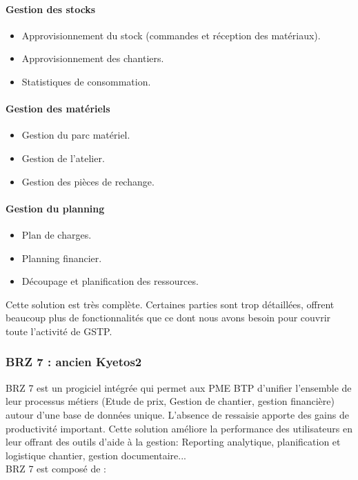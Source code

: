 				\paragraph{Gestion des stocks}
				\begin{itemize}
				    \item Approvisionnement du stock (commandes et réception des matériaux).
				    \item Approvisionnement des chantiers.
				    \item Statistiques de consommation.
				\end{itemize}
				
				\paragraph{Gestion des matériels}
				\begin{itemize}
				    \item Gestion du parc matériel.
				    \item Gestion de l'atelier.
				    \item Gestion des pièces de rechange.
				\end{itemize}
				
				\paragraph{Gestion du planning}
				\begin{itemize}
				    \item Plan de charges.
				    \item Planning financier.
				    \item Découpage et planification des ressources.
				\end{itemize}
				
		Cette solution est très complète. Certaines parties sont trop détaillées, offrent beaucoup plus de fonctionnalités que ce dont nous avons besoin pour couvrir toute l'activité de GSTP.
			
		\subsubsection{BRZ 7 : ancien Kyetos2}
		
		BRZ 7 est un progiciel intégrée qui permet aux PME BTP d'unifier l'ensemble de leur processus métiers (Etude de prix, Gestion de chantier, gestion financière) autour d'une base de données unique. 
    L'absence de ressaisie apporte des gains de productivité important. 
    Cette solution améliore la performance des utilisateurs en leur offrant des outils d'aide à la gestion: Reporting analytique, 
    planification et logistique chantier, gestion documentaire...\\ 
		BRZ 7 est composé de :
 		
